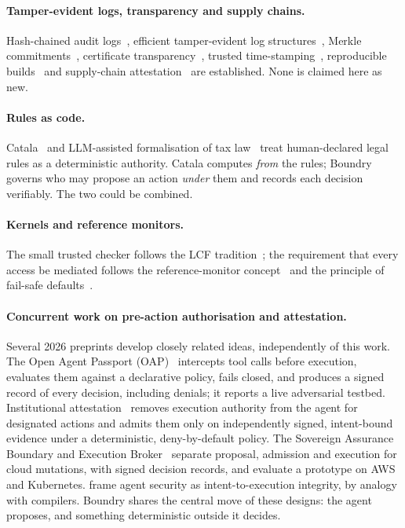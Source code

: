 \documentclass[11pt,a4paper]{article}
\begin{document}
\paragraph{Tamper-evident logs, transparency and supply chains.} Hash-chained audit logs~\citep{schneier1999audit}, efficient tamper-evident log structures~\citep{crosby2009tamper}, Merkle commitments~\citep{merkle1987signature}, certificate transparency~\citep{rfc6962,rfc9162}, trusted time-stamping~\citep{rfc3161}, reproducible builds~\citep{lamb2022reproducible} and supply-chain attestation~\citep{torresarias2019intoto} are established. None is claimed here as new.

\paragraph{Rules as code.} Catala~\citep{merigoux2021catala} and LLM-assisted formalisation of tax law~\citep{yadamsuren2025irc} treat human-declared legal rules as a deterministic authority. Catala computes \emph{from} the rules; Boundry governs who may propose an action \emph{under} them and records each decision verifiably. The two could be combined.

\paragraph{Kernels and reference monitors.} The small trusted checker follows the LCF tradition~\citep{gordon1979lcf,demoura2021lean4}; the requirement that every access be mediated follows the reference-monitor concept~\citep{anderson1972planning} and the principle of fail-safe defaults~\citep{saltzer1975protection}.

\paragraph{Concurrent work on pre-action authorisation and attestation.} Several 2026 preprints develop closely related ideas, independently of this work. The Open Agent Passport (OAP)~\citep{uchibeke2026oap} intercepts tool calls before execution, evaluates them against a declarative policy, fails closed, and produces a signed record of every decision, including denials; it reports a live adversarial testbed. Institutional attestation~\citep{salfeldnebgen2026ia} removes execution authority from the agent for designated actions and admits them only on independently signed, intent-bound evidence under a deterministic, deny-by-default policy. The Sovereign Assurance Boundary and Execution Broker~\citep{he2026sab,he2026seb} separate proposal, admission and execution for cloud mutations, with signed decision records, and evaluate a prototype on AWS and Kubernetes. \citet{qu2026i2e} frame agent security as intent-to-execution integrity, by analogy with compilers. Boundry shares the central move of these designs: the agent proposes, and something deterministic outside it decides.
\end{document}
